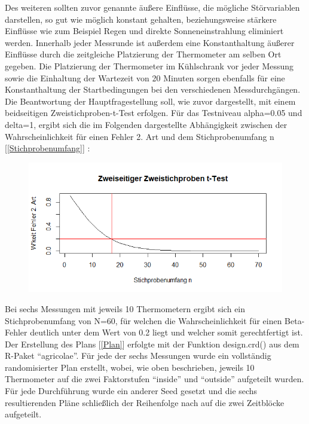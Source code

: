 \documentclass[ ngerman, fontsize= 12pt, paper=a4, headings=big, titlepage=true]{article}
\begin{document}
 Des weiteren sollten zuvor genannte äußere Einflüsse, die mögliche Störvariablen darstellen, so gut wie möglich konstant gehalten, beziehungsweise stärkere Einflüsse wie zum Beispiel Regen und direkte Sonneneinstrahlung eliminiert werden. Innerhalb jeder Messrunde ist außerdem eine Konstanthaltung äußerer Einflüsse durch die zeitgleiche Platzierung der Thermometer am selben Ort gegeben. Die Platzierung der Thermometer im Kühlschrank vor jeder Messung sowie die Einhaltung der Wartezeit von 20 Minuten sorgen ebenfalls für eine Konstanthaltung der Startbedingungen bei den verschiedenen Messdurchgängen.\\


 Die Beantwortung der Hauptfragestellung soll, wie zuvor dargestellt, mit einem beidseitigen Zweistichproben-t-Test erfolgen. Für das Testniveau alpha=0.05 und delta=1, ergibt sich die im Folgenden dargestellte Abhängigkeit zwischen der Wahrscheinlichkeit für einen Fehler 2. Art und dem Stichprobenumfang n [\ref{Stichprobenumfang}] : \\
 
\newpage
\begin{figure}[ht]
\centering
\includegraphics[scale=0.7]{Stichprobenumfang.png}

\end{figure} 
 
 Bei sechs Messungen mit jeweils 10 Thermometern ergibt sich ein Stichprobenumfang von N=60, für welchen die Wahrscheinlichkeit für einen Beta-Fehler deutlich unter dem Wert von 0.2 liegt und welcher somit gerechtfertigt ist. \\

 Der Erstellung des Plans [\ref{Plan}] erfolgte mit der Funktion design.crd() aus dem R-Paket \enquote{agricolae}. Für jede der sechs Messungen wurde ein vollständig randomisierter Plan erstellt, wobei, wie oben beschrieben, jeweils 10 Thermometer auf die zwei Faktorstufen \enquote{inside} und \enquote{outside} aufgeteilt wurden. Für jede Durchführung wurde ein anderer Seed gesetzt und die sechs resultierenden Pläne schließlich der Reihenfolge nach auf die zwei Zeitblöcke aufgeteilt. 
\end{document}
